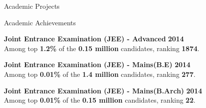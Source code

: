 \documentclass{resume} %
\begin{document}
\begin{rSection}{Academic Projects}







\end{rSection}


\begin{rSection}{Academic Achievements}

{\bf \large Joint Entrance Examination (JEE) - Advanced} \hfill \textbf{2014} \\ 
Among top \textbf{1.2\%} of the \textbf{0.15 million} candidates, ranking \textbf{1874}.

{\bf \large Joint Entrance Examination (JEE) - Mains(B.E)} \hfill \textbf{2014} \\ 
Among top \textbf{0.01\%} of the \textbf{1.4 million} candidates, ranking \textbf{277}.

{\bf \large Joint Entrance Examination (JEE) - Mains(B.Arch)} \hfill \textbf{2014} \\ 
Among top \textbf{0.01\%} of the \textbf{0.15 million} candidates, ranking \textbf{22}.

\end{rSection}
\end{document}

